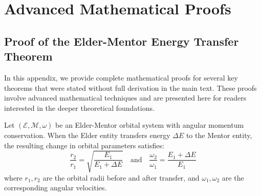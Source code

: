 \chapter{Advanced Mathematical Proofs}

\section{Proof of the Elder-Mentor Energy Transfer Theorem}

In this appendix, we provide complete mathematical proofs for several key theorems that were stated without full derivation in the main text. These proofs involve advanced mathematical techniques and are presented here for readers interested in the deeper theoretical foundations.

\begin{theorem}
Let $(\mathcal{E}, \mathcal{M}, \omega)$ be an Elder-Mentor orbital system with angular momentum conservation. When the Elder entity transfers energy $\Delta E$ to the Mentor entity, the resulting change in orbital parameters satisfies:
\begin{equation}
\frac{r_2}{r_1} = \sqrt{\frac{E_1}{E_1 + \Delta E}} \quad \text{and} \quad \frac{\omega_2}{\omega_1} = \frac{E_1 + \Delta E}{E_1}
\end{equation}
where $r_1, r_2$ are the orbital radii before and after transfer, and $\omega_1, \omega_2$ are the corresponding angular velocities.
\end{theorem}

